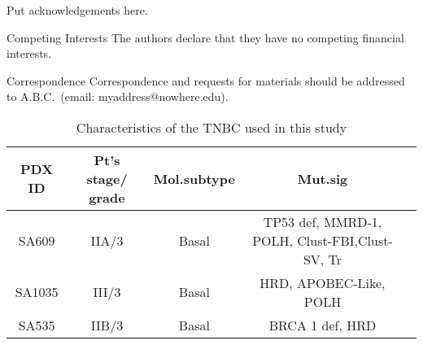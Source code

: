 \documentclass{nature}
\begin{document}







\begin{addendum}
 \item Put acknowledgements here.
 \item[Competing Interests] The authors declare that they have no
competing financial interests.
 \item[Correspondence] Correspondence and requests for materials
should be addressed to A.B.C.~(email: myaddress@nowhere.edu).
\end{addendum}


\begin{table}
\centering
\caption{Characteristics of the TNBC used in this study}
\medskip
\begin{tabular}{ccccc}
\hline
PDX ID & Pt's stage/ grade & Mol.subtype & Mut.sig\\
\hline
SA609 & IIA/3 & Basal & TP53 def, MMRD-1, POLH, Clust-FBI,Clust-SV, Tr \\
SA1035 & III/3 & Basal & HRD, APOBEC-Like, POLH\\
SA535 & IIB/3 & Basal & BRCA 1 def, HRD\\


\hline
\end{tabular}
\end{table}
\end{document}
